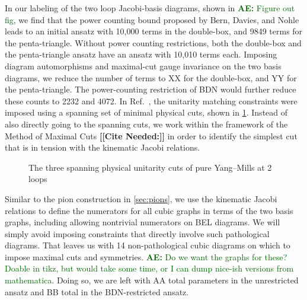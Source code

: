 \documentclass[11pt,letter]{article}
\newcommand{\ace}[1]{\textcolor{darkgreen}{\textbf{AE:}{ #1}}}
\newcommand{\citepls}[1]{{\bf\color{red}[[Cite Needed:#1]]}}
\begin{document}
In our labeling of the two loop Jacobi-basis diagrams, shown in
\ace{Figure out fig}, we find that the power counting bound proposed
by Bern, Davies, and Nohle leads to an initial ansatz with 10,000
terms in the double-box, and 9849 terms for the penta-triangle.
Without power counting restrictions, both the double-box and the
penta-triangle ansatz have an ansatz with 10,010 terms each.  Imposing
diagram automorphisms and maximal-cut gauge invariance on the two
basis diagrams, we reduce the number of terms to XX for the
double-box, and YY for the penta-triangle.  The power-counting
restriction of BDN would further reduce these counts to 2232 and 4072.
In Ref.~\cite{Bern:2015ooa}, the unitarity matching constraints were
imposed using a spanning set of minimal physical cuts, shown in
\cref{fig:ym-spanning}.  Instead of also directly going to the
spanning cuts, we work within the framework of the Method of Maximal
Cuts \citepls{} in order to identify the simplest cut that is in
tension with the kinematic Jacobi relations.

\begin{figure}
  \begin{center}
    \begin{subfigure}{0.3\textwidth}
      \begin{center}
        \LMCut
      \end{center}
    \end{subfigure}
    \begin{subfigure}{0.3\textwidth}
      \begin{center}
        \PhysicalCutOne{}{}{}{}
      \end{center}
    \end{subfigure}
    \begin{subfigure}{0.3\textwidth}
      \begin{center}
        \PhysicalCutTwo{}{}{}{}
      \end{center}
    \end{subfigure}
  \end{center}
  \caption{The three spanning physical unitarity cuts of pure
    Yang--Mills at 2 loops}
  \label{fig:ym-spanning}
\end{figure}

Similar to the pion construction in \cref{sec:pions}, we use the
kinematic Jacobi relations to define the numerators for all cubic
graphs in terms of the two basis graphs, including allowing nontrivial
numerators on BEL diagrams.  We will simply avoid imposing
constraints that directly involve such pathological diagrams.  That
leaves us with 14 non-pathological cubic diagrams on which to impose
maximal cuts and symmetries. \ace{Do we want the graphs for these?
  Doable in tikz, but would take some time, or I can dump nice-ish
  versions from mathematica}.  Doing so, we are left with AA total
parameters in the unrestricted ansatz and BB total in the
BDN-restricted ansatz.
\end{document}
